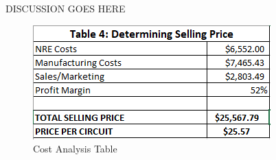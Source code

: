 

DISCUSSION GOES HERE


\begin{figure}[H]
	\centering
	\includegraphics[width=0.7\linewidth]{tablecost}
	\caption{Cost Analysis Table}
	\label{fig:tablecost}
\end{figure}


